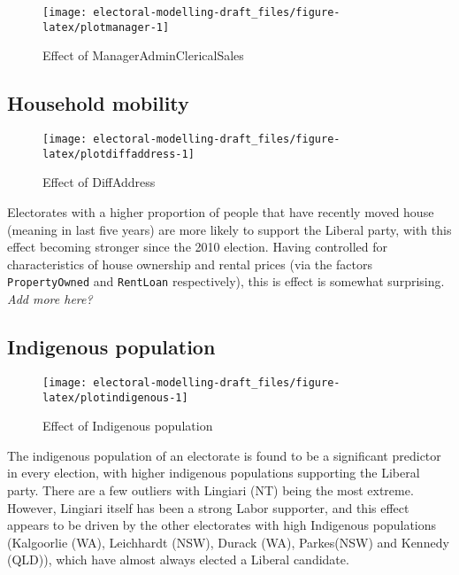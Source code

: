 \documentclass[openany]{book}
\begin{document}
\begin{figure}[h]

{\centering \texttt{[image: electoral-modelling-draft\_files/figure-latex/plotmanager-1]} 

}

\caption{Effect of ManagerAdminClericalSales}\label{fig:plotmanager}
\end{figure}

\hypertarget{household-mobility}{%
\subsection{Household mobility}\label{household-mobility}}

\begin{figure}[h]

{\centering \texttt{[image: electoral-modelling-draft\_files/figure-latex/plotdiffaddress-1]} 

}

\caption{Effect of DiffAddress}\label{fig:plotdiffaddress}
\end{figure}

Electorates with a higher proportion of people that have recently moved house (meaning in last five years) are more likely to support the Liberal party, with this effect becoming stronger since the 2010 election. Having controlled for characteristics of house ownership and rental prices (via the factors \texttt{PropertyOwned} and \texttt{RentLoan} respectively), this is effect is somewhat surprising. \emph{Add more here?}

\hypertarget{indigenous-population}{%
\subsection{Indigenous population}\label{indigenous-population}}

\begin{figure}[h]

{\centering \texttt{[image: electoral-modelling-draft\_files/figure-latex/plotindigenous-1]} 

}

\caption{Effect of Indigenous population}\label{fig:plotindigenous}
\end{figure}

The indigenous population of an electorate is found to be a significant predictor in every election, with higher indigenous populations supporting the Liberal party. There are a few outliers with Lingiari (NT) being the most extreme. However, Lingiari itself has been a strong Labor supporter, and this effect appears to be driven by the other electorates with high Indigenous populations (Kalgoorlie (WA), Leichhardt (NSW), Durack (WA), Parkes(NSW) and Kennedy (QLD)), which have almost always elected a Liberal candidate.
\end{document}
